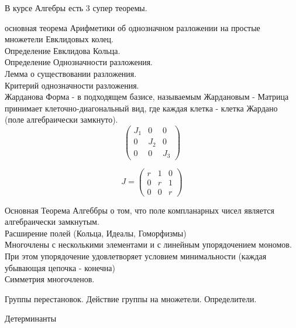 \begin{title}
  В курсе Алгебры есть 3 супер теоремы.
\end{title}

 основная теорема Арифметики об однозначном разложении на простые
множетели Евклидовых колец.\\
   Определение Евклидова Кольца.\\
   Определение Однозначности разложения.\\
   Лемма о существовании разложения.\\
   Критерий однозначности разложения.\\

 Жарданова Форма - в подходящем базисе, называемым Жардановым - Матрица
принимает клеточно-диагональный вид, где каждая клетка - клетка Жардано
(поле алгебраически замкнуто).\\

\begin{displaymath}
\left(\begin{array}{lcr}
J_1 & 0   & 0\\
0   & J_2 & 0\\
0   & 0   & J_3
\end{array}\right)
\end{displaymath}

\begin{displaymath}
J = \left(\begin{array}{lcr}
r & 1 & 0\\
0 & r & 1\\
0 & 0 & r
\end{array}\right)
\end{displaymath}

 Основная Теорема Алгеббры о том, что поле компланарных чисел является
алгебраически замкнутым.\\
   Расширение полей (Кольца, Идеалы, Гоморфизмы)\\
   Многочлены с несколькими элементами и с линейным упорядочением мономов.
   При этом упорядочение удовлетворяет условием минимальности (каждая убывающая
   цепочка - конечна)\\
   Симметрия многочленов.\\

\begin{title}
  Группы перестановок. Действие группы на множетели. Определители.
\end{title}

\begin{title}[\Large]
  Детерминанты
\end{title}

